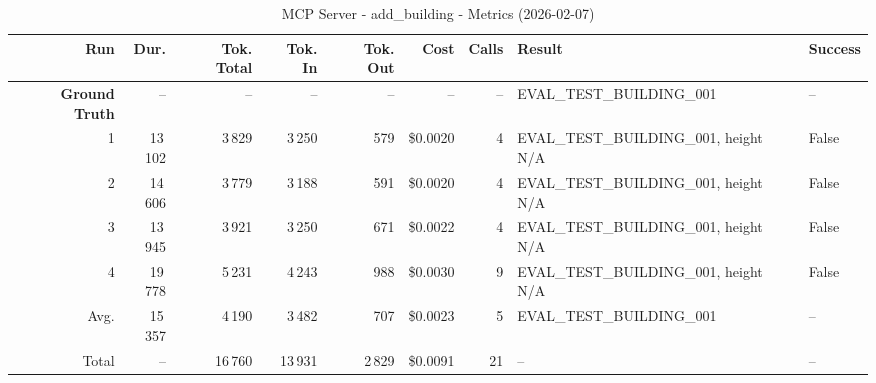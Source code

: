 \documentclass[a4paper,11pt]{article}
\begin{document}
\begin{table}[ht]
\centering
\scriptsize
\caption{MCP Server - add\_building - Metrics (2026-02-07)}
\label{tab:mcp\_add\_building\_metrics\_2026-02-07}
\begin{tabular}{r r r r r r r p{3cm} l}
\hline
Run & Dur. & Tok. Total & Tok. In & Tok. Out & Cost & Calls & Result & Success \\
\hline
\textbf{Ground Truth} & -- & -- & -- & -- & -- & -- & EVAL\_TEST\_BUILDING\_001 & -- \\
1 & 13\,102 & 3\,829 & 3\,250 & 579 & \$0.0020 & 4 & EVAL\_TEST\_BUILDING\_001, height N/A & False \\
2 & 14\,606 & 3\,779 & 3\,188 & 591 & \$0.0020 & 4 & EVAL\_TEST\_BUILDING\_001, height N/A & False \\
3 & 13\,945 & 3\,921 & 3\,250 & 671 & \$0.0022 & 4 & EVAL\_TEST\_BUILDING\_001, height N/A & False \\
4 & 19\,778 & 5\,231 & 4\,243 & 988 & \$0.0030 & 9 & EVAL\_TEST\_BUILDING\_001, height N/A & False \\
\hline
Avg. & 15\,357 & 4\,190 & 3\,482 & 707 & \$0.0023 & 5 & EVAL\_TEST\_BUILDING\_001 & -- \\
Total & -- & 16\,760 & 13\,931 & 2\,829 & \$0.0091 & 21 & -- & -- \\
\hline
\end{tabular}
\end{table}

\clearpage
\end{document}
